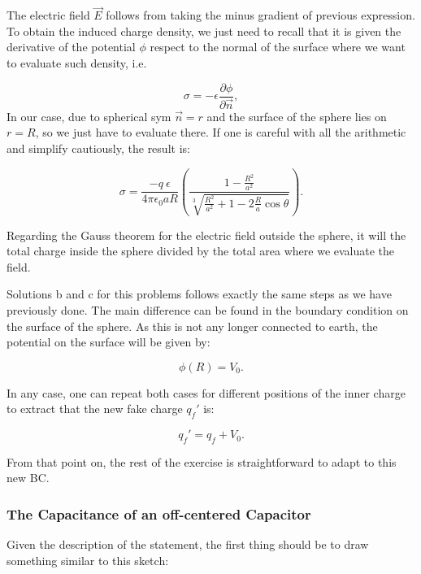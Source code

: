 The electric field $\vec{E}$ follows from taking the minus gradient of previous expression. To obtain the induced charge density, we just need to recall that it is given the derivative of the potential $\phi$ respect to the normal of the surface where we want to evaluate such density, i.e.

\begin{equation}
	\sigma = - \epsilon \frac{\partial \phi}{\partial \vec{n}},
\end{equation}
In our case, due to spherical sym $\vec{n} = r$ and the surface of the sphere lies on $r=R$, so we just have to evaluate there. If one is careful with all the arithmetic and simplify cautiously,  the result is:

\begin{equation}
	\sigma = \frac{-q \: \epsilon}{4 \pi \epsilon_{0} a R} \left(\frac{1-\tfrac{R^{2}}{a^{2}}}{\sqrt[3]{\tfrac{R^{2}}{a^{2}} +1 - 2 \tfrac{R}{a}\cos \theta}}\right).
\end{equation}

Regarding the Gauss theorem for the electric field outside the sphere, it will the total charge inside the sphere divided by the total area where we evaluate the field. 

Solutions b and c for this problems follows exactly the same steps as we have previously done. The main difference can be found in the boundary condition on the surface of the sphere. As this is not any longer connected to earth, the potential on the surface will be given by:

\begin{equation}
	\phi (R) = V_{0}.
\end{equation}

In any case, one can repeat both cases for different positions of the inner charge to extract that the new fake charge $q_{f}'$ is:

\begin{equation}
	q_{f}' = q_{f} + V_{0}.
\end{equation}

From that point on, the rest of the exercise is straightforward to adapt to this new BC.

\subsubsection{The Capacitance of an off-centered Capacitor}\label{The Capacitance of an off-centered Capacitor}

Given the description of the statement, the first thing should be to draw something similar to this sketch:

